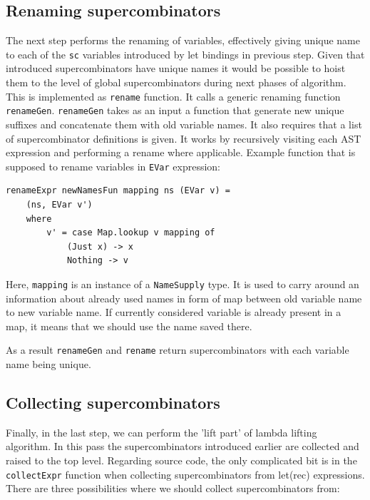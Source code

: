 \documentclass[12pt,a4paper]{report}
\begin{document}
\subsection{Renaming supercombinators}
The next step performs the renaming of variables, effectively giving unique
name to each of the \texttt{sc} variables introduced by let bindings
in previous step. Given that introduced supercombinators have unique names it
would be possible to hoist them to the level of global supercombinators during
next phases of algorithm. This is implemented as \texttt{rename} function. It
calls a generic renaming function \texttt{renameGen}. \texttt{renameGen} takes
as an input a function that generate new unique suffixes and concatenate them
with old variable names. It also requires that a list of supercombinator
definitions is given. It works by recursively visiting each AST expression and
performing a rename where applicable. Example function that is supposed to
rename variables in \texttt{EVar} expression:

\vspace*{0.2in}
\begin{lstlisting}[style=haskell]
renameExpr newNamesFun mapping ns (EVar v) =
    (ns, EVar v')
    where
        v' = case Map.lookup v mapping of
            (Just x) -> x
            Nothing -> v
\end{lstlisting}

Here, \texttt{mapping} is an instance of a \texttt{NameSupply} type. It is used
to carry around an information about already used names in form of map between
old variable name to new variable name. If currently considered variable is
already present in a map, it means that we should use the name saved there.

As a result \texttt{renameGen} and \texttt{rename} return supercombinators with
each variable name being unique.

\subsection{Collecting supercombinators}
Finally, in the last step, we can perform the 'lift part' of lambda lifting
algorithm. In this pass the supercombinators introduced earlier are collected
and raised to the top level.  Regarding source code, the only complicated bit
is in the \texttt{collectExpr} function when collecting supercombinators from
let(rec) expressions.  There are three possibilities where we should
collect supercombinators from:
\end{document}
